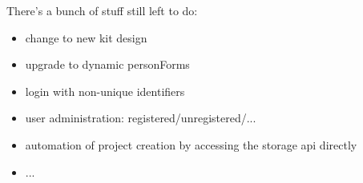 \begin{frame}[c]
    There's a bunch of stuff still left to do:
    \begin{itemize}[<+(1)->]
        \item change to new kit design
        \item upgrade to dynamic personForms
        \item login with non-unique identifiers
        \item user administration: registered/unregistered/...
        \item automation of project creation by accessing the storage api directly
        \item ...
    \end{itemize}
\end{frame}
